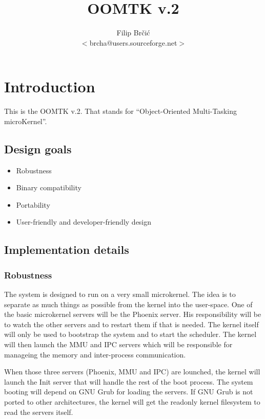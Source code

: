 \documentclass{article}
\title{OOMTK v.2}
\author{Filip Br\v ci\' c\\$<$brcha@users.sourceforge.net$>$}
\begin{document}
\maketitle

\section{Introduction}

This is the OOMTK v.2. That stands for ``Object-Oriented Multi-Tasking microKernel''.

\subsection{Design goals}

\begin{itemize}
\item Robustness
\item Binary compatibility
\item Portability
\item User-friendly and developer-friendly design
\end{itemize}

\subsection{Implementation details}

\subsubsection{Robustness}

The system is designed to run on a very small microkernel. The idea is to separate
as much things as possible from the kernel into the user-space. One of the basic
microkernel servers will be the Phoenix server. His responsibility will be to watch
the other servers and to restart them if that is needed. The kernel itself will
only be used to bootstrap the system and to start the scheduler. The kernel will then
launch the MMU and IPC servers which will be responsible for manageing the memory
and inter-process communication.

When those three servers (Phoenix, MMU and IPC) are lounched, the kernel will launch
the Init server that will handle the rest of the boot process. The system booting
will depend on GNU Grub for loading the servers. If GNU Grub is not ported to other
architectures, the kernel will get the readonly kernel filesystem to read the servers
itself.
\end{document}
